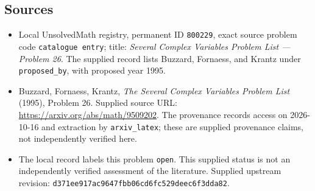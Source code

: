 \documentclass[11pt]{article}
\begin{document}
\subsection{Sources}
\begin{itemize}
\item Local UnsolvedMath registry, permanent ID \texttt{800229}, exact source problem code \texttt{catalogue entry}; title: \emph{Several Complex Variables Problem List --- Problem 26}. The supplied record lists Buzzard, Fornaess, and Krantz under \texttt{proposed\_by}, with proposed year 1995.
\item Buzzard, Fornaess, Krantz, \emph{The Several Complex Variables Problem List} (1995), Problem 26. Supplied source URL: \url{https://arxiv.org/abs/math/9509202}. The provenance records access on 2026-10-16 and extraction by \texttt{arxiv\_latex}; these are supplied provenance claims, not independently verified here.
\item The local record labels this problem \texttt{open}. This supplied status is not an independently verified assessment of the literature. Supplied upstream revision: \texttt{d371ee917ac9647fbb06cd6fc529deec6f3dda82}.
\end{itemize}
\end{document}

